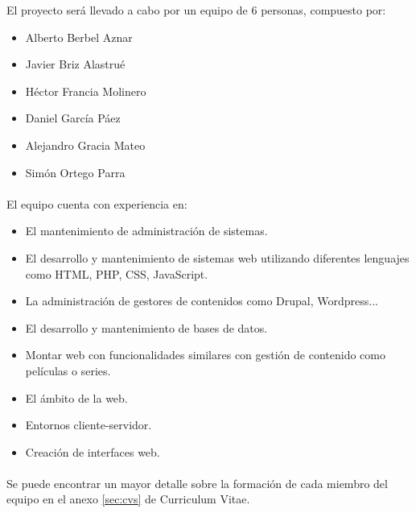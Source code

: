 El proyecto será llevado a cabo por un equipo de 6 personas, compuesto por:
\begin{itemize}
\item Alberto Berbel Aznar
\item Javier Briz Alastrué
\item Héctor Francia Molinero
\item Daniel García Páez
\item Alejandro Gracia Mateo
\item Simón Ortego Parra
\end{itemize}

\paragraph{} El equipo cuenta con experiencia en:
\begin{itemize}

\item El mantenimiento de administración de sistemas.
\item El desarrollo y mantenimiento de sistemas web utilizando diferentes lenguajes como HTML, PHP, CSS, JavaScript.
\item La administración de gestores de contenidos como Drupal, Wordpress... 
\item El desarrollo y mantenimiento de bases de datos.
\item Montar web con funcionalidades similares con gestión de contenido como películas o series.
\item El ámbito de la web.
\item Entornos cliente-servidor.
\item Creación de interfaces web.

\end{itemize}

\paragraph{} Se puede encontrar un mayor detalle sobre la formación de cada miembro del equipo en el anexo \ref{sec:cvs} de Curriculum Vitae.